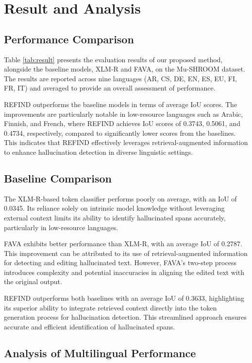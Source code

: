 \section{Result and Analysis}

\subsection{Performance Comparison}

Table \ref{tab:result} presents the evaluation results of our proposed method, alongside the baseline models, XLM-R and FAVA, on the Mu-SHROOM dataset. The results are reported across nine languages (AR, CS, DE, EN, ES, EU, FI, FR, IT) and averaged to provide an overall assessment of performance.

REFIND outperforms the baseline models in terms of average IoU scores.
The improvements are particularly notable in low-resource languages such as Arabic, Finnish, and French, where REFIND achieves IoU scores of 0.3743, 0.5061, and 0.4734, respectively, compared to significantly lower scores from the baselines. This indicates that REFIND effectively leverages retrieval-augmented information to enhance hallucination detection in diverse linguistic settings.


\subsection{Baseline Comparison}

The XLM-R-based token classifier performs poorly on average, with an IoU of 0.0345. Its reliance solely on intrinsic model knowledge without leveraging external context limits its ability to identify hallucinated spans accurately, particularly in low-resource languages.

FAVA exhibits better performance than XLM-R, with an average IoU of 0.2787. This improvement can be attributed to its use of retrieval-augmented information for detecting and editing hallucinated text. However, FAVA's two-step process introduces complexity and potential inaccuracies in aligning the edited text with the original output.

REFIND outperforms both baselines with an average IoU of 0.3633, highlighting its superior ability to integrate retrieved context directly into the token generation process for hallucination detection. 
This streamlined approach ensures accurate and efficient identification of hallucinated spans.

\subsection{Analysis of Multilingual Performance}

